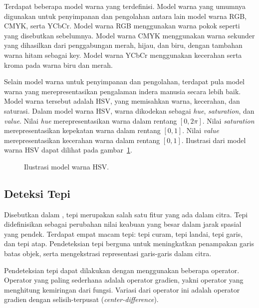 \documentclass[conference, a4paper]{IEEEtran}
\begin{document}
Terdapat beberapa model warna yang terdefinisi. Model warna yang umumnya digunakan untuk penyimpanan dan pengolahan antara lain model warna RGB, CMYK, serta YCbCr. Model warna RGB menggunakan warna pokok seperti yang disebutkan sebelumnya. Model warna CMYK menggunakan warna sekunder yang dihasilkan dari penggabungan merah, hijau, dan biru, dengan tambahan warna hitam sebagai key. Model warna YCbCr menggunakan kecerahan serta kroma pada warna biru dan merah.

Selain model warna untuk penyimpanan dan pengolahan, terdapat pula model warna yang merepresentasikan pengalaman indera manusia secara lebih baik. Model warna tersebut adalah HSV, yang memisahkan warna, kecerahan, dan saturasi. Dalam model warna HSV, warna dikodekan sebagai \textit{hue}, \textit{saturation}, dan \textit{value}. Nilai \textit{hue} merepresentasikan warna dalam rentang $[0, 2\pi]$. Nilai \textit{saturation} merepresentasikan kepekatan warna dalam rentang $[0,1]$. Nilai \textit{value} merepresentasikan kecerahan warna dalam rentang $[0,1]$. Ilustrasi dari model warna HSV dapat dilihat pada gambar~\ref{hsv}.

\begin{figure}[ht]
  \begin{center}
    
  \end{center}
  \caption{Ilustrasi model warna HSV.}\label{hsv}
\end{figure}

\subsection{Deteksi Tepi}
Disebutkan dalam \cite{munir2022edge}, tepi merupakan salah satu fitur yang ada dalam citra. Tepi didefinisikan sebagai perubahan nilai keabuan yang besar dalam jarak spasial yang pendek. Terdapat empat macam tepi: tepi curam, tepi landai, tepi garis, dan tepi atap. Pendeteksian tepi berguna untuk meningkatkan penampakan garis batas objek, serta mengekstrasi representasi garis-garis dalam citra.

Pendeteksian tepi dapat dilakukan dengan menggunakan beberapa operator. Operator yang paling sederhana adalah operator gradien, yakni operator yang menghitung kemiringan dari fungsi. Variasi dari operator ini adalah operator gradien dengan selisih-terpusat (\textit{center-difference}).
\end{document}
